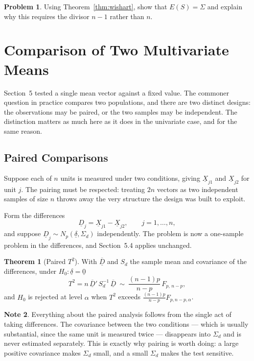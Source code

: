 \documentclass[11pt,a4paper]{article}
\theoremstyle{definition}
\newtheorem{thm}{Theorem}[section]
\newtheorem{note}[thm]{Note}
\newtheorem{problemx}{Problem}[section]
\newenvironment{problem}{\begin{problemx}}{\end{problemx}}
\begin{document}
\begin{problem}
Using Theorem~\ref{thm:wishart}, show that $E(S)=\Sigma$ and explain why this
requires the divisor $n-1$ rather than $n$.
\end{problem}

\section{Comparison of Two Multivariate Means}

Section~5 tested a single mean vector against a fixed value. The commoner
question in practice compares two populations, and there are two distinct
designs: the observations may be paired, or the two samples may be independent.
The distinction matters as much here as it does in the univariate case, and for
the same reason.

\subsection{Paired Comparisons}

Suppose each of $n$ units is measured under two conditions, giving
$\underline{X}_{j1}$ and $\underline{X}_{j2}$ for unit $j$. The pairing must be
respected: treating $2n$ vectors as two independent samples of size $n$ throws
away the very structure the design was built to exploit.

Form the differences
$$\underline{D}_j = \underline{X}_{j1}-\underline{X}_{j2},
\qquad j = 1,\dots,n,$$
and suppose $\underline{D}_j \sim N_p\left(\underline{\delta},\Sigma_d\right)$
independently. The problem is now a one-sample problem in the differences, and
Section~5.4 applies unchanged.

\begin{thm}[Paired $T^{2}$]
\label{thm:pairedT2}
With $\overline{\underline{D}}$ and $S_d$ the sample mean and covariance of the
differences, under $H_0: \underline{\delta}=\underline{0}$
$$T^{2} = n\,\overline{\underline{D}}'\,S_d^{-1}\,\overline{\underline{D}}
\ \sim\ \frac{(n-1)p}{n-p}\,F_{p,\,n-p},$$
and $H_0$ is rejected at level $\alpha$ when $T^{2}$ exceeds
$\frac{(n-1)p}{n-p}F_{p,n-p,\alpha}$.
\end{thm}

\begin{note}
Everything about the paired analysis follows from the single act of taking
differences. The covariance between the two conditions --- which is usually
substantial, since the same unit is measured twice --- disappears into
$\Sigma_d$ and is never estimated separately. This is exactly why pairing is
worth doing: a large positive covariance makes $\Sigma_d$ small, and a small
$\Sigma_d$ makes the test sensitive.
\end{note}
\end{document}
